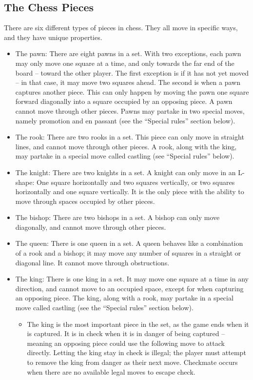 \documentclass[12pt, a4paper]{article}
\begin{document}
\subsection{The Chess Pieces}
There are six different types of pieces in chess. They all move in specific ways, and they have unique properties.

\begin{itemize}
\item The pawn: There are eight pawns in a set. With two exceptions, each pawn may only move one square at a time, and only towards the far end of the board – toward the other player. The first exception is if it has not yet moved – in that case, it may move two squares ahead. The second is when a pawn captures another piece. This can only happen by moving the pawn one square forward diagonally into a square occupied by an opposing piece. A pawn cannot move through other pieces. Pawns may partake in two special moves, namely promotion and en passant (see the “Special rules” section below).
\item The rook: There are two rooks in a set. This piece can only move in straight lines, and cannot move through other pieces. A rook, along with the king, may partake in a special move called castling (see “Special rules” below).
\item The knight: There are two knights in a set. A knight can only move in an L-shape: One square horizontally and two squares vertically, or two squares horizontally and one square vertically. It is the only piece with the ability to move through spaces occupied by other pieces.
\item The bishop: There are two bishops in a set. A bishop can only move diagonally, and cannot move through other pieces.
\item The queen: There is one queen in a set. A queen behaves like a combination of a rook and a bishop; it may move any number of squares in a straight or diagonal line. It cannot move through obstructions.
\item The king: There is one king in a set. It may move one square at a time in any direction, and cannot move to an occupied space, except for when capturing an opposing piece. The king, along with a rook, may partake in a special move called castling (see the “Special rules” section below).
 
\begin{itemize}
\item The king is the most important piece in the set, as the game ends when it is captured. It is in check when it is in danger of being captured – meaning an opposing piece could use the following move to attack directly. Letting the king stay in check is illegal; the player must attempt to remove the king from danger as their next move. Checkmate occurs when there are no available legal moves to escape check. 
\end{itemize}
\end{itemize}
\end{document}
